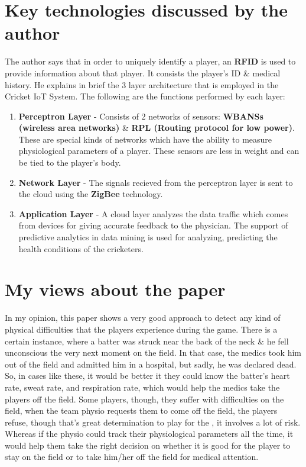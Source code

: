 \documentclass{Cricketer's Health Supervision}
\begin{document}
    \section*{Key technologies discussed by the author}
     The author says that in order to uniquely identify a player, an \textbf{RFID} is used to provide information about that player. It consists the player's ID \& medical history. He explains in brief the 3 layer architecture that is employed in the Cricket IoT System. The following are the functions performed by each layer:
    
    \begin{enumerate}
        \item \textbf{Perceptron Layer} - Consists of 2 networks of sensors: \textbf{WBANSs (wireless area networks)} \& \textbf{RPL (Routing protocol for low power)}. These are special kinds of networks which have the ability to measure physiological parameters of a player. These sensors are less in weight and can be tied to the player's body.
        \item \textbf{Network Layer} - The signals recieved from the perceptron layer is sent to the cloud using the \textbf{ZigBee} technology.
        \item \textbf{Application Layer} - A cloud layer analyzes the data traffic which comes from devices for giving accurate feedback to the physician. The support of predictive analytics in data mining is used for analyzing, predicting the health conditions of the cricketers.
    \end{enumerate}
    
    \section*{My views about the paper}
    In my opinion, this paper shows a very good approach to detect any kind of physical difficulties that the players experience during the game. There is a certain instance, where a batter was struck near the back of the neck \& he fell unconscious the very next moment on the field. In that case, the medics took him out of the field and admitted him in a hospital, but sadly, he was declared dead. So, in cases like these, it would be better it they could know the batter's heart rate, sweat rate, and respiration rate, which would help the medics take the players off the field. Some players, though, they suffer with difficulties on the field, when the team physio requests them to come off the field, the players refuse, though that's great determination to play for the , it involves a lot of risk. Whereas if the physio could track their physiological parameters all the time, it would help them take the right decision on whether it is good for the player to stay on the field or to take him/her off the field for medical attention.\\
\end{document}
